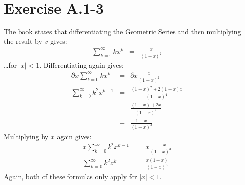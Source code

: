 \documentclass{article}
\begin{document}
\section*{Exercise A.1-3}

The book states that differentiating the Geometric Series and then multiplying the result by $x$ gives:
\begin{eqnarray*}
	\sum_{k=0}^\infty k x^k & = & \frac{x}{\left ( 1-x \right )^2}
\end{eqnarray*}
\ldots for $\left | x \right | < 1$. Differentiating again gives:
\begin{eqnarray*}
	\partial x \sum_{k=0}^\infty k x^k & = & \partial x \frac{x}{\left ( 1-x \right )^2} \\
	\sum_{k=0}^\infty k^2 x^{k-1} & = & \frac{\left ( 1-x \right )^2 + 2\left ( 1-x \right )x}{\left ( 1-x \right )^4} \\
	& = & \frac{\left ( 1-x \right ) + 2x}{\left ( 1-x \right )^4} \\
	& = & \frac{1+x}{\left ( 1-x \right )^3}
\end{eqnarray*}
Multiplying by $x$ again gives:
\begin{eqnarray*}
	x \sum_{k=0}^\infty k^2 x^{k-1} & = & x \frac{1+x}{\left ( 1-x \right )^3} \\
	\sum_{k=0}^\infty k^2 x^k & = & \frac{x \left ( 1+x \right )}{\left ( 1-x \right )^3}
\end{eqnarray*}
Again, both of these formulas only apply for $\left | x \right | < 1$.
\end{document}
